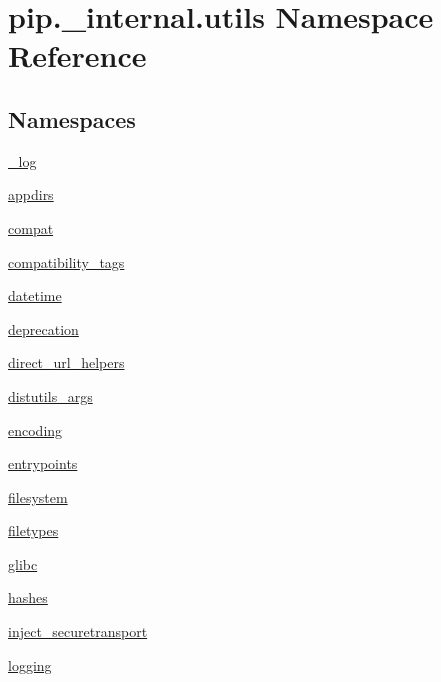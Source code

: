 \hypertarget{namespacepip_1_1__internal_1_1utils}{}\section{pip.\+\_\+internal.\+utils Namespace Reference}
\label{namespacepip_1_1__internal_1_1utils}
\subsection*{Namespaces}
\begin{DoxyCompactItemize}
\item 
 \hyperlink{namespacepip_1_1__internal_1_1utils_1_1__log}{\+\_\+log}
\item 
 \hyperlink{namespacepip_1_1__internal_1_1utils_1_1appdirs}{appdirs}
\item 
 \hyperlink{namespacepip_1_1__internal_1_1utils_1_1compat}{compat}
\item 
 \hyperlink{namespacepip_1_1__internal_1_1utils_1_1compatibility__tags}{compatibility\+\_\+tags}
\item 
 \hyperlink{namespacepip_1_1__internal_1_1utils_1_1datetime}{datetime}
\item 
 \hyperlink{namespacepip_1_1__internal_1_1utils_1_1deprecation}{deprecation}
\item 
 \hyperlink{namespacepip_1_1__internal_1_1utils_1_1direct__url__helpers}{direct\+\_\+url\+\_\+helpers}
\item 
 \hyperlink{namespacepip_1_1__internal_1_1utils_1_1distutils__args}{distutils\+\_\+args}
\item 
 \hyperlink{namespacepip_1_1__internal_1_1utils_1_1encoding}{encoding}
\item 
 \hyperlink{namespacepip_1_1__internal_1_1utils_1_1entrypoints}{entrypoints}
\item 
 \hyperlink{namespacepip_1_1__internal_1_1utils_1_1filesystem}{filesystem}
\item 
 \hyperlink{namespacepip_1_1__internal_1_1utils_1_1filetypes}{filetypes}
\item 
 \hyperlink{namespacepip_1_1__internal_1_1utils_1_1glibc}{glibc}
\item 
 \hyperlink{namespacepip_1_1__internal_1_1utils_1_1hashes}{hashes}
\item 
 \hyperlink{namespacepip_1_1__internal_1_1utils_1_1inject__securetransport}{inject\+\_\+securetransport}
\item 
 \hyperlink{namespacepip_1_1__internal_1_1utils_1_1logging}{logging}

\end{DoxyCompactItemize}

